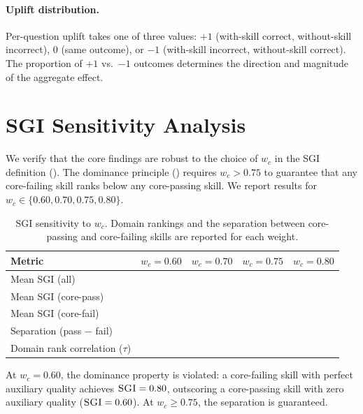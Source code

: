 \paragraph{Uplift distribution.}
Per-question uplift takes one of three values: $+1$ (with-skill correct, without-skill incorrect), $0$ (same outcome), or $-1$ (with-skill incorrect, without-skill correct).
The proportion of $+1$ vs.\ $-1$ outcomes determines the direction and magnitude of the aggregate effect.


\section{SGI Sensitivity Analysis}
\label{app:sgi_sensitivity}

We verify that the core findings are robust to the choice of $w_c$ in the \textsc{SGI} definition ().
The dominance principle () requires $w_c > 0.75$ to guarantee that any core-failing skill ranks below any core-passing skill.
We report results for $w_c \in \{0.60, 0.70, 0.75, 0.80\}$.

\begin{table}[t]
\centering\small
\caption{\textsc{SGI} sensitivity to $w_c$. Domain rankings and the separation between core-passing and core-failing skills are reported for each weight.}
\begin{tabular}{lcccc}
\toprule
\textbf{Metric} & $w_c{=}0.60$ & $w_c{=}0.70$ & $w_c{=}0.75$ & $w_c{=}0.80$ \\
\midrule
Mean \textsc{SGI} (all)          & \todo{} & \todo{} & \todo{} & \todo{} \\
Mean \textsc{SGI} (core-pass)    & \todo{} & \todo{} & \todo{} & \todo{} \\
Mean \textsc{SGI} (core-fail)    & \todo{} & \todo{} & \todo{} & \todo{} \\
Separation (pass $-$ fail)       & \todo{} & \todo{} & \todo{} & \todo{} \\
Domain rank correlation ($\tau$) & \todo{} & \todo{} & \todo{} & \todo{} \\
\bottomrule
\end{tabular}
\label{tab:sgi_sensitivity}
\end{table}

At $w_c = 0.60$, the dominance property is violated: a core-failing skill with perfect auxiliary quality achieves $\textsc{SGI} = 0.80$, outscoring a core-passing skill with zero auxiliary quality ($\textsc{SGI} = 0.60$).
At $w_c \geq 0.75$, the separation is guaranteed.



